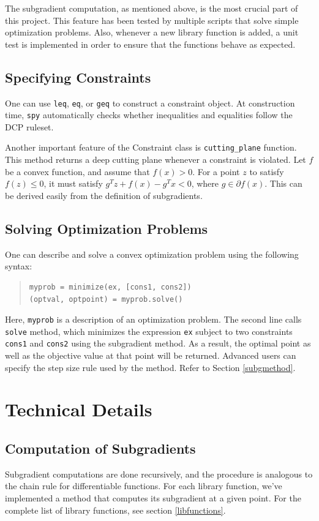 \documentclass[12pt]{article}
\begin{document}
The subgradient computation, as mentioned above, is the most crucial part of this project. This feature has been tested by multiple scripts that solve simple optimization problems. Also, whenever a new library function is added, a unit test is implemented in order to ensure that the functions behave as expected.

\subsection{Specifying Constraints}
One can use \verb'leq', \verb'eq', or \verb'geq' to construct a constraint
object. At construction time, \verb'spy' automatically checks whether inequalities
and equalities follow the DCP ruleset.

Another important feature of the Constraint class is \verb'cutting_plane'
function. This method returns a deep cutting plane whenever a constraint is
violated. Let $f$ be a convex function, and assume that $f(x) > 0$. For a point $z$ to satisfy $f(z) \le 0$, it must satisfy $g^T z + f(x)-g^T x<0$, where $g \in \partial f(x)$. This can be derived easily from the definition of subgradients.

\subsection{Solving Optimization Problems}
One can describe and solve a convex optimization problem using the following syntax:

\begin{quote}
\begin{verbatim}
myprob = minimize(ex, [cons1, cons2])
(optval, optpoint) = myprob.solve()
\end{verbatim}
\end{quote}

\noindent Here, \verb'myprob' is a description of an optimization problem. The second line calls \verb'solve' method, which minimizes the expression \verb'ex' subject to two constraints \verb'cons1' and \verb'cons2' using the subgradient method. As a result,
the optimal point as well as the objective value at that point will be
returned. Advanced users can specify the step size rule used by the method. Refer to Section \ref{subgmethod}.

\section{Technical Details}

\subsection{Computation of Subgradients}
Subgradient computations are done recursively, and the procedure is
analogous to the chain rule for differentiable functions. 
For each library function, we've implemented a method that computes 
its subgradient at a given point. For the complete list of library functions, see section \ref{libfunctions}.
\end{document}
